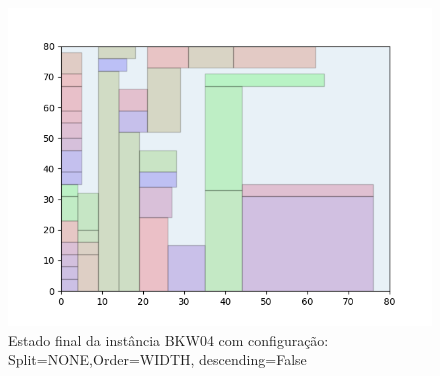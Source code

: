 \begin{figure}[H]
    \centering
    \caption[]{Estado final da instância BKW04 com configuração: Split=NONE,Order=WIDTH, descending=False}
    \label{fig:bkw04-none-width-false}
    \includegraphics[scale=0.5]{output/figures/bkw/bkw04/none/width/false/00}
\end{figure}